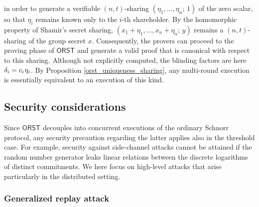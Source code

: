 \documentclass{iacrtrans}
\begin{document}
in order to generate a verifiable $(n, t)$-sharing
$(\eta_1, \dots, \eta_n;\hspace{2pt} 1)$
of the zero scalar, so that $\eta_i$
remains known only to the $i$-th shareholder.
By the homomorphic property of Shamir's secret sharing,
$(x_1 + \eta_1, \dots, x_n + \eta_n;\hspace{2pt} y)$
remains a $(n, t)$-sharing of the group secret $x$.
Consequently,
the provers can proceed to the proving phase of $\mathsf{ORST}$
and generate a valid proof that is
canonical with respect to this sharing.
Although not explicitly computed,
the blinding factors are here
$\delta_i = c_i\hspace{0.5pt}\eta_i$.
By Proposition \ref{orst_uniqueness_sharing},
any multi-round execution is essentially equivalent
to an execution of this kind.

\subsection{Security considerations}

Since $\mathsf{ORST}$
decouples into concurrent executions
of the ordinary Schnorr protocol, any security precaution
regarding the latter applies also in the threshold case.
For example, security against side-channel attacks
cannot be attained if the random number generator
leaks linear relations between the discrete logarithms
of distinct commitments.
We here focus on high-level attacks that
arise particularly in the distributed setting.

\subsubsection{Generalized replay attack}\label{section_generalized_replay_attack}
\end{document}
